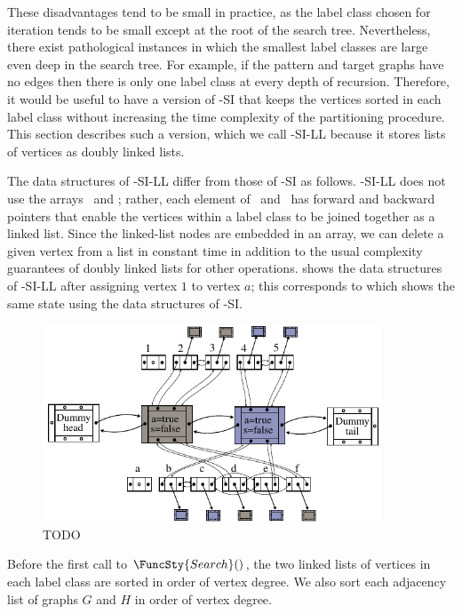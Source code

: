 These disadvantages tend to be small in practice, as the label class chosen for
iteration tends to be small except at the root of the search tree.
Nevertheless, there exist pathological instances in which the smallest label
classes are large even deep in the search tree.  For example, if the pattern
and target graphs have no edges then there is only one label class at every
depth of recursion.  Therefore, it would be useful to have a version of
\McSplit-SI that keeps the vertices sorted in each label class without increasing
the time complexity of the partitioning procedure.  This section describes
such a version, which we call \McSplit-SI-LL because it stores lists of
vertices as doubly linked lists.

The data structures of \McSplit-SI-LL differ from those of \McSplit-SI
as follows.  \McSplit-SI-LL does not use the arrays \Garray\ and \Harray;
rather, each element of \Gptrs\ and \Hptrs\ has forward and backward pointers
that enable the vertices within a label class to be joined together as a linked list.
Since the linked-list nodes are embedded in an array, we can delete a given
vertex from a list in constant time in addition to the usual complexity
guarantees of doubly linked lists for other operations.  
shows the data structures of \McSplit-SI-LL after assigning vertex $1$ to vertex $a$;
this corresponds to  which shows the same state
using the data structures of \McSplit-SI.

\begin{figure}[htb]
    \centering
    \includegraphics*[width=0.9\textwidth]{14b-mcsplit-induced-si/figs/data-structure-step-1-ll-version}
    \caption{TODO}
    \label{figure:si-data-structures-ll-version}
\end{figure}

Before the first call to $\FuncSty{Search}()$, the two linked lists of vertices in
each label class are sorted in order of vertex degree.  We also sort each adjacency list
of graphs $G$ and $H$ in order of vertex degree.

